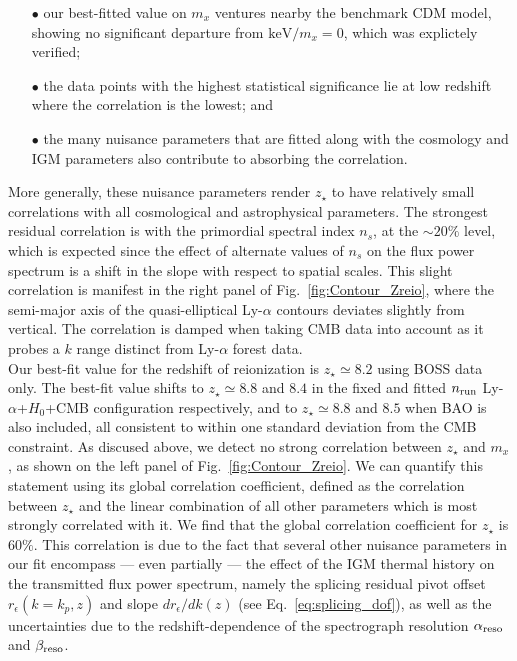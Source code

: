 \begin{itemize}
\item[$\bullet$] our best-fitted value on $m_x$  ventures nearby the benchmark CDM model, showing no significant departure from $\mathrm{keV}/m_x=0$, which was explictely verified; \\

\item[$\bullet$] the data points with the highest statistical significance lie at low redshift where the correlation is the lowest; and \\

\item[$\bullet$] the many nuisance parameters that are fitted along with the cosmology and IGM parameters also contribute to absorbing the correlation.\\
\end{itemize}

More generally, these nuisance parameters render $z_\star$ to have relatively small correlations with all cosmological and astrophysical parameters. The strongest residual correlation is with the primordial spectral index $n_s$, at the $\sim 20\%$ level, which is expected since the effect of alternate values of $n_s$ on the flux power spectrum is a shift in the slope with respect to spatial scales. This slight correlation is manifest in the right panel of Fig.~\ref{fig:Contour_Zreio}, where the semi-major axis of the quasi-elliptical Ly-$\alpha$ contours deviates slightly from vertical. The correlation is damped when taking CMB data into account as it probes a $k$ range distinct from Ly-$\alpha$ forest data. \\


Our best-fit value for the redshift of reionization is $z_{\star} \simeq 8.2$ using BOSS data only. The best-fit value shifts to $z_{\star} \simeq 8.8$ and  $8.4$ in the fixed and fitted $n_{\rm{run}}$ Ly-$\alpha$+$H_0$+CMB configuration respectively, and to $z_{\star} \simeq 8.8$ and $ 8.5$ when BAO is also included, all consistent to within one standard deviation from the CMB constraint. As discused above, we detect no strong correlation between $z_{\star}$ and $m_x$, as shown on the left panel of Fig.~\ref{fig:Contour_Zreio}. We can quantify this statement using its global correlation coefficient, defined as the correlation between $z_\star$ and the linear combination of all other parameters which is most strongly correlated with it. We find that the global correlation coefficient for $z_\star$ is $60\%$. This  correlation is due to the fact that several other nuisance parameters in our fit encompass --- even partially --- the effect of the IGM thermal history on the transmitted flux power spectrum, namely the splicing residual pivot offset $r_{\epsilon} (k=k_p, z)$ and slope $dr_{\epsilon}/dk (z)$ (see Eq.~\ref{eq:splicing_dof}), as well as the uncertainties due to the redshift-dependence of the spectrograph resolution $\alpha_{\rm{reso}}$ and $\beta_{\rm{reso}}$. \\




